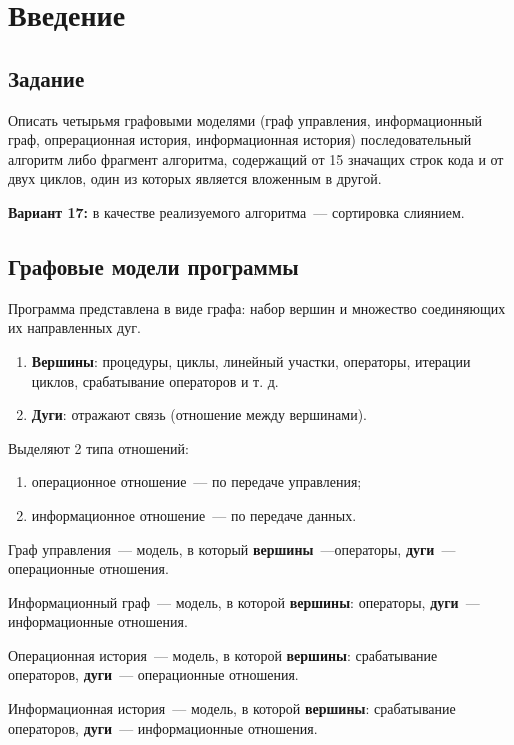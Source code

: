 \chapter{Введение}

\section{Задание}

Описать четырьмя графовыми моделями (граф управления, информационный граф, опрерационная история, информационная история) последовательный алгоритм либо фрагмент алгоритма, содержащий от 15 значащих строк кода и от двух циклов, один из которых является вложенным в другой.

\textbf{Вариант 17:} в качестве реализуемого алгоритма~--- сортировка слиянием.

\section{Графовые модели программы}

Программа представлена в виде графа: набор вершин и множество соединяющих их направленных дуг.

\begin{enumerate}
    \item \textbf{Вершины}: процедуры, циклы, линейный участки, операторы, итерации циклов, срабатывание операторов и т. д.
    \item \textbf{Дуги}: отражают связь (отношение между вершинами). 
\end{enumerate}

Выделяют 2 типа отношений:
\begin{enumerate}
    \item операционное отношение~--- по передаче управления;
    \item информационное отношение~--- по передаче данных.
\end{enumerate}

Граф управления~--- модель, в который \textbf{вершины}~---операторы, \textbf{дуги}~--- операционные отношения.

Информационный граф~--- модель, в которой \textbf{вершины}: операторы, \textbf{дуги}~--- информационные отношения.

Операционная история~--- модель, в которой \textbf{вершины}: срабатывание операторов, \textbf{дуги}~--- операционные отношения.

Информационная история~--- модель, в которой \textbf{вершины}: срабатывание операторов, \textbf{дуги}~--- информационные отношения.